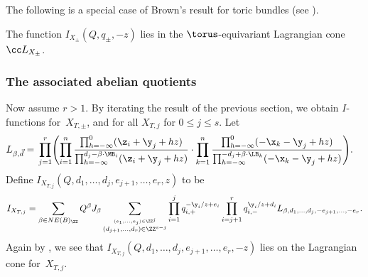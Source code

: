 The following is a special case of Brown's result for toric bundles (see \cite{Brown}).
\begin{Theorem}
The function $I_{X_\pm}(Q, q_\pm, -z)$ lies in the $\torus$-equivariant Lagrangian cone $\cc L_{X_\pm}$.
\end{Theorem}

\subsubsection{The associated abelian quotients}
Now assume $r > 1$. By iterating the result of the previous section, we obtain $I$-functions for~$X_{T, \pm}$, and for all $X_{T, j}$ for $0 \leq j \leq s$.
Let
\begin{align*}
	L_{\beta,\vec{d}}={}& \prod_{j=1}^r \Biggl(\prod_{i=1}^n \frac{\prod_{h=-\infty}^0 (\z_i+\y_j+hz)}{\prod_{h=-\infty}^{d_j-\beta\cdot \MB_i} (\z_i+\y_j+hz)}
	\cdot \prod_{k=1}^{n}\frac{\prod_{h=-\infty}^{0}(-\x_k -\y_j+hz)}{\prod_{h=-\infty}^{-d_j+\beta\cdot \LB_k}(-\x_k -\y_j+hz)}\Biggr).
\end{align*}
Define $I_{X_{T, j}} (Q, d_1, \dots, d_j, e_{j+1}, \dots, e_r, z)$ to be
\begin{equation*} I_{X_{T, j}} =
\sum_{\beta \in NE(B)_\ZZ} Q^\beta J_\beta \sum_{\stackrel{(e_1, \dots, e_j) \in \ZZ^j}{ (d_{j+1}, \dots, d_r) \in \ZZ^{s-j}}} \prod_{i=1}^j q_{i, +}^{-\y_i/z+e_i}\prod_{i=j+1}^r q_{i, -}^{\y_i/z+d_i}
L_{\beta, d_1, \dots, d_j, -e_{j+1}, \dots, -e_r}.
\end{equation*}
Again by \cite{Brown}, we see that $I_{X_{T, j}} (Q, d_1, {\dots}, d_j, e_{j+1}, {\dots}, e_r, -z)$ lies on the Lagrangian cone for~$X_{T, j}$.


